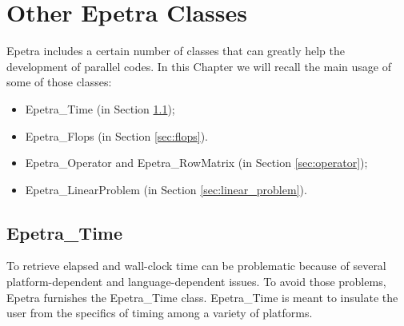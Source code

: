 % 
% 
% 
%  
%  
% 

\section{Other Epetra Classes}
\label{chap:epetra_others}

Epetra includes a certain number of classes that can greatly help the
development of parallel codes. In this Chapter we will recall the main
usage of some of those classes:
\begin{itemize}
\item Epetra\_Time (in Section \ref{sec:time});
\item Epetra\_Flops (in Section \ref{sec:flops}).
\item Epetra\_Operator and Epetra\_RowMatrix (in Section \ref{sec:operator});
\item Epetra\_LinearProblem (in Section \ref{sec:linear_problem}).
\end{itemize}


\subsection{Epetra\_Time}
\label{sec:time}

To retrieve elapsed and wall-clock time can be problematic because of
several platform-dependent and language-dependent issues. To avoid those
problems, Epetra furnishes the Epetra\_Time class.  Epetra\_Time is
meant to insulate the user from the specifics of timing among a variety
of platforms.

